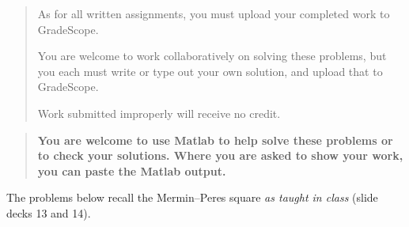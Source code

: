 \documentclass[12pt]{article}
\begin{document}

\begin{quote}
    As for all written assignments, you must upload your completed work to GradeScope.

    You are welcome to work collaboratively on solving these problems, but you each must write or type out your own solution, and upload that to GradeScope.

    Work submitted improperly will receive no credit.
\end{quote}

\begin{quote}\bf
You are welcome to use Matlab to help solve these problems or to check your solutions.  Where you are asked to show your work, you can paste the Matlab output.
\end{quote}

The problems below recall the Mermin--Peres square \emph{as taught in class} (slide decks 13 and 14).
\end{document}
